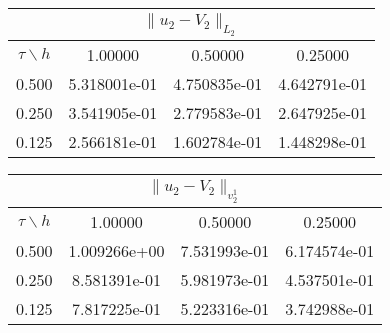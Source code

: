\begin{center}
\begin{tabular}{||c|c|c|c||}
\hline
\hline
\multicolumn{4}{||c||}{$\|u_2-V_2\| _{L_2}$}\\ 
\hline
\hline
$\tau \backslash h$ & 1.00000 & 0.50000 & 0.25000\\ 
\hline 
0.500& 5.318001e-01 &4.750835e-01 &4.642791e-01 \\ 
\hline
0.250& 3.541905e-01 &2.779583e-01 &2.647925e-01 \\ 
\hline
0.125& 2.566181e-01 &1.602784e-01 &1.448298e-01 \\ 
\hline
\hline
\end{tabular}
\end{center}
\begin{center}
\begin{tabular}{||c|c|c|c||}
\hline
\hline
\multicolumn{4}{||c||}{$\|u_2-V_2\| _{v_2^1}$}\\ 
\hline
\hline
$\tau \backslash h$ & 1.00000 & 0.50000 & 0.25000\\ 
\hline 
0.500& 1.009266e+00 &7.531993e-01 &6.174574e-01 \\ 
\hline
0.250& 8.581391e-01 &5.981973e-01 &4.537501e-01 \\ 
\hline
0.125& 7.817225e-01 &5.223316e-01 &3.742988e-01 \\ 
\hline
\hline
\end{tabular}
\end{center}